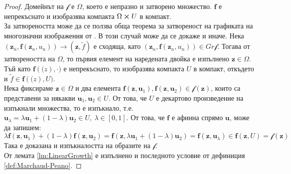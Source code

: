 \begin{proof}
  Домейнът на $\mathscr{f}$ е $\Omega$, което е непразно и затворено множество. $\mathbf{f}$ е непрекъснато и изобразява компакта $\Omega \cross U$ в компакт. \\
  За затвореността може да се ползва обща теорема за затвореност на графиката на многозначни изображения от \cite[теорема~17.11]{Aliprantis2006}.
  В този случай може да се докаже и иначе.
  Нека $(\mathbf{z}_n, \mathbf{f}(\mathbf{z}_n, u_n)) \rightarrow (\mathbf{z}, \tilde{f})$ е сходяща, като $(\mathbf{z}_n, \mathbf{f}(\mathbf{z}_n, u_n)) \in Gr \mathscr{f}$.
  Тогава от затвореността на $\Omega$, то първия елемент на наредената двойка е изпълнено $\mathbf{z} \in \Omega$.
  Тъй като $\mathbf{f}(\mathbf(z), \cdot)$ е непрекъснато, то изобразява компакта $U$ в компакт, откъдето и $\tilde{f} \in \mathbf{f}(\mathbf(z), U)$. \\
  Нека фиксираме $\mathbf{z} \in \Omega$ и два елемента $\mathbf{f}(\mathbf{z}, \mathbf{u}_1), \mathbf{f}(\mathbf{z}, \mathbf{u}_2) \in \mathscr{f}(\mathbf{z})$, които са представени за някакви $\mathbf{u}_1, \mathbf{u}_2 \in U$.
  От това, че $U$ е декартово произведение на изпъкнали множества, то е изпъкнало, т.е. $\mathbf{u}_{\lambda} = \lambda \mathbf{u}_1 + (1-\lambda) \mathbf{u}_2 \in U,~ \lambda \in [0, 1]$.
  От това, че $\mathbf{f}$ е афинна спрямо $\mathbf{u}$, може да запишем:
  \begin{equation*}
    \lambda \mathbf{f}(\mathbf{z}, \mathbf{u}_1) + (1-\lambda)\mathbf{f}(\mathbf{z}, \mathbf{u}_2) = \mathbf{f}(\mathbf{z}, \lambda \mathbf{u}_1 + (1-\lambda)\mathbf{u}_2) = \mathbf{f}(\mathbf{z}, \mathbf{u}_{\lambda}) \in \mathbf{f}(\mathbf{z}, U) = \mathscr{f}(\mathbf{z})
  \end{equation*}
  Така е доказана и изпъкналостта на образите на $\mathscr{f}$. \\
  От лемата \ref{lm:LinearGrowth} е изпълнено и последното условие от дефиниция \ref{def:Marchaud-Peano}.
\end{proof}

